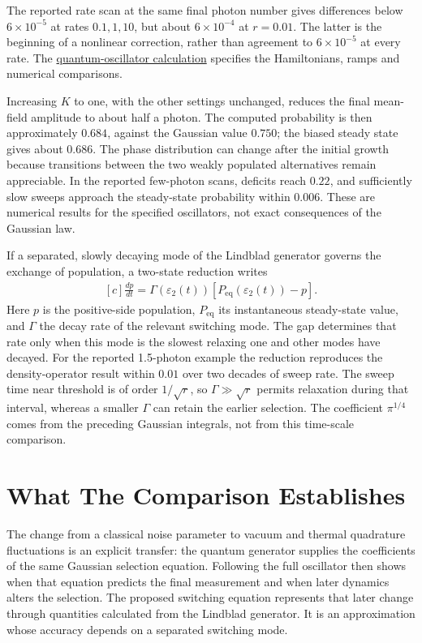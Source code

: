 \documentclass[11pt,oneside]{book}
\newenvironment{centeredalign}{\[\begin{gathered}[c]}{\end{gathered}\]}
\begin{document}
The reported rate scan at the same final photon number gives
differences below \(6\times10^{-5}\) at rates \(0.1,1,10\),
but about \(6\times10^{-4}\) at \(r=0.01\). The latter
is the beginning of a nonlinear correction, rather than
agreement to \(6\times10^{-5}\) at every rate. The
\href{https://github.com/synthetix-institute/fieldbridge/blob/main/docs/tutorial/30_quantum_write.md}{quantum-oscillator calculation}
specifies the Hamiltonians, ramps and numerical comparisons.

Increasing \(K\) to one, with the other settings unchanged,
reduces the final mean-field amplitude to about half a photon.
The computed probability is then approximately \(0.684\),
against the Gaussian value \(0.750\); the biased steady state
gives about \(0.686\). The phase distribution can change
after the initial growth because transitions between the
two weakly populated alternatives remain appreciable. In
the reported few-photon scans, deficits reach \(0.22\),
and sufficiently slow sweeps approach the steady-state
probability within \(0.006\). These are numerical results
for the specified oscillators, not exact consequences of
the Gaussian law.

If a separated, slowly decaying mode of the Lindblad
generator governs the exchange of population, a two-state
reduction writes
\begin{centeredalign}
\frac{dp}{dt}=\Gamma(\varepsilon_2(t))
[P_{\mathrm{eq}}(\varepsilon_2(t))-p].
\end{centeredalign}
Here \(p\) is the positive-side population,
\(P_{\mathrm{eq}}\) its instantaneous steady-state value,
and \(\Gamma\) the decay rate of the relevant switching
mode. The gap determines that rate only when this mode
is the slowest relaxing one and other modes have decayed.
For the reported 1.5-photon example the reduction reproduces
the density-operator result within \(0.01\) over two decades
of sweep rate. The sweep time near threshold is of order
\(1/\sqrt r\), so \(\Gamma\gg\sqrt r\) permits
relaxation during that interval, whereas a smaller
\(\Gamma\) can retain the earlier selection. The
coefficient \(\pi^{1/4}\) comes from the preceding
Gaussian integrals, not from this time-scale comparison.

\section{What The Comparison Establishes}
The change from a classical noise parameter to vacuum and
thermal quadrature fluctuations is an explicit transfer:
the quantum generator supplies the coefficients of the
same Gaussian selection equation. Following the full
oscillator then shows when that equation predicts the
final measurement and when later dynamics alters the
selection. The proposed switching equation represents
that later change through quantities calculated from
the Lindblad generator. It is an approximation whose
accuracy depends on a separated switching mode.
\end{document}
